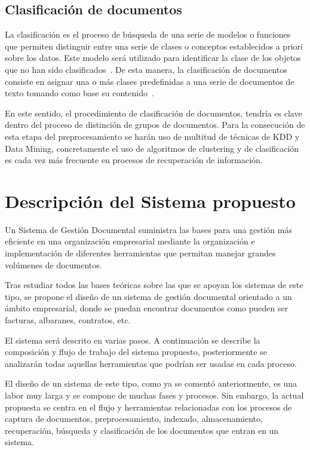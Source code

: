 \documentclass[runningheads,a4paper]{llncs}
\theoremstyle{break}
\begin{document}
\subsection{Clasificación de documentos}

La clasificación es el proceso de búsqueda de una serie de modelos o funciones que permiten distinguir entre una serie de clases o conceptos establecidos a priori sobre los datos. Este modelo será utilizado para identificar la clase de los objetos que no han sido clasificados~\cite{han:01}. De esta manera, la clasificación de documentos consiste en asignar una o más clases predefinidas a una serie de documentos de texto tomando como base su contenido~\cite{mer:00}.

En este sentido, el procedimiento de clasificación de documentos, tendría es clave dentro del proceso de distinción de grupos de documentos. Para la consecución de esta etapa del preprocesamiento se harán uso de multitud de técnicas de KDD y Data Mining, concretamente el uso de algoritmos de clustering y de clasificación es cada vez más frecuente en procesos de recuperación de información.

\section{Descripción del Sistema propuesto}
Un Sistema de Gestión Documental suministra las bases para una gestión más eficiente en una organización empresarial mediante la organización e implementación de diferentes herramientas que permitan manejar grandes volúmenes de documentos.

Tras estudiar todos las bases teóricas sobre las que se apoyan los sistemas de este tipo, se propone el diseño de un sistema de gestión documental orientado a un ámbito empresarial, donde se puedan encontrar documentos como pueden ser facturas, albaranes, contratos, etc.

El sistema será descrito en varias pasos. A continuación se describe la composición y flujo de trabajo del sistema propuesto, posteriormente se analizarán todas aquellas herramientas que podrían ser usadas en cada proceso.

El diseño de un sistema de este tipo, como ya se comentó anteriormente, es una labor muy larga y se compone de muchas fases y procesos. Sin embargo, la actual propuesta se centra en el flujo y herramientas relacionadas con los procesos de captura de documentos, preprocesamiento, indexado, almacenamiento, recuperación, búsqueda y clasificación de los documentos que entran en un sistema.
\end{document}
